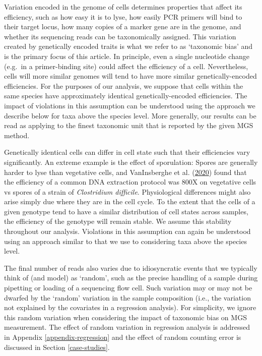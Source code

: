 \documentclass[
]{article}
\begin{document}
Variation encoded in the genome of cells determines properties that affect its efficiency, such as how easy it is to lyse, how easily PCR primers will bind to their target locus, how many copies of a marker gene are in the genome, and whether its sequencing reads can be taxonomically assigned.
This variation created by genetically encoded traits is what we refer to as `taxonomic bias' and is the primary focus of this article.
In principle, even a single nucleotide change (e.g.~in a primer-binding site) could affect the efficiency of a cell.
Nevertheless, cells will more similar genomes will tend to have more similar genetically-encoded efficiencies.
For the purposes of our analysis, we suppose that cells within the same species have approximately identical genetically-encoded efficiencies.
The impact of violations in this assumption can be understood using the approach we describe below for taxa above the species level.
More generally, our results can be read as applying to the finest taxonomic unit that is reported by the given MGS method.

Genetically identical cells can differ in cell state such that their efficiencies vary significantly.
An extreme example is the effect of sporulation: Spores are generally harder to lyse than vegetative cells, and VanInsberghe et al. (\protect\hyperlink{ref-vaninsberghe2020diar}{2020}) found that the efficiency of a common DNA extraction protocol was 800X on vegetative cells vs spores of a strain of \emph{Clostridium difficile}.
Physiological differences might also arise simply due where they are in the cell cycle.
To the extent that the cells of a given genotype tend to have a similar distribution of cell states across samples, the efficiency of the genotype will remain stable.
We assume this stability throughout our analysis.
Violations in this assumption can again be understood using an approach similar to that we use to considering taxa above the species level.

The final number of reads also varies due to idiosyncratic events that we typically think of (and model) as `random', such as the precise handling of a sample during pipetting or loading of a sequencing flow cell.
Such variation may or may not be dwarfed by the `random' variation in the sample composition (i.e., the variation not explained by the covariates in a regression analysis).
For simplicity, we ignore this random variation when considering the impact of taxonomic bias on MGS measurement.
The effect of random variation in regression analysis is addressed in Appendix \ref{appendix-regression} and the effect of random counting error is discussed in Section \ref{case-studies}.
\end{document}
